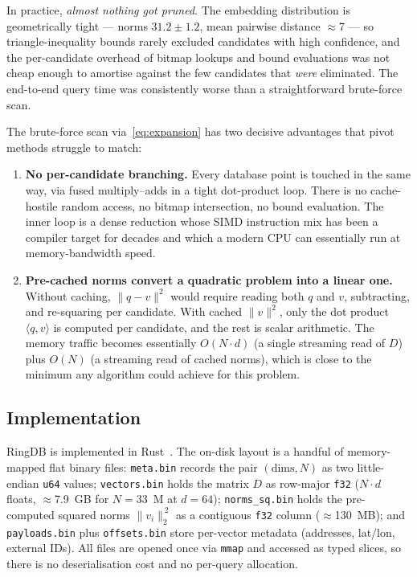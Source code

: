 \documentclass[11pt,a4paper]{article}
\begin{document}
In practice, \emph{almost nothing got pruned}. The embedding
distribution is geometrically tight --- norms $31.2 \pm 1.2$, mean
pairwise distance $\approx$7 --- so triangle-inequality bounds rarely
excluded candidates with high confidence, and the per-candidate
overhead of bitmap lookups and bound evaluations was not cheap
enough to amortise against the few candidates that \emph{were}
eliminated. The end-to-end query time was consistently worse than a
straightforward brute-force scan.

The brute-force scan via~\eqref{eq:expansion} has two decisive
advantages that pivot methods struggle to match:

\begin{enumerate}
  \item \textbf{No per-candidate branching.} Every database point is
    touched in the same way, via fused multiply--adds in a tight
    dot-product loop. There is no cache-hostile random access, no
    bitmap intersection, no bound evaluation. The inner loop is a
    dense reduction whose SIMD instruction mix has been a compiler
    target for decades and which a modern CPU can essentially run at
    memory-bandwidth speed.
  \item \textbf{Pre-cached norms convert a quadratic problem into a
    linear one.} Without caching, $\|q - v\|^{2}$ would require
    reading both $q$ and $v$, subtracting, and re-squaring per
    candidate. With cached $\|v\|^{2}$, only the dot product
    $\langle q, v\rangle$ is computed per candidate, and the rest is
    scalar arithmetic. The memory traffic becomes essentially
    $O(N \cdot d)$ (a single streaming read of $D$) plus $O(N)$ (a
    streaming read of cached norms), which is close to the minimum
    any algorithm could achieve for this problem.
\end{enumerate}

\subsection{Implementation}
\label{sec:impl}
RingDB is implemented in Rust~\cite{ringdb}. The on-disk layout is a
handful of memory-mapped flat binary files: \texttt{meta.bin} records
the pair $(\text{dims}, N)$ as two little-endian \texttt{u64} values;
\texttt{vectors.bin} holds the matrix $D$ as row-major \texttt{f32}
($N \cdot d$ floats, $\approx$7.9~GB for $N = 33$~M at $d = 64$);
\texttt{norms\_sq.bin} holds the pre-computed squared norms
$\|v_i\|_{2}^{\,2}$ as a contiguous \texttt{f32} column
($\approx$130~MB); and \texttt{payloads.bin} plus \texttt{offsets.bin}
store per-vector metadata (addresses, lat/lon, external IDs). All
files are opened once via \texttt{mmap} and accessed as typed slices,
so there is no deserialisation cost and no per-query allocation.
\end{document}
